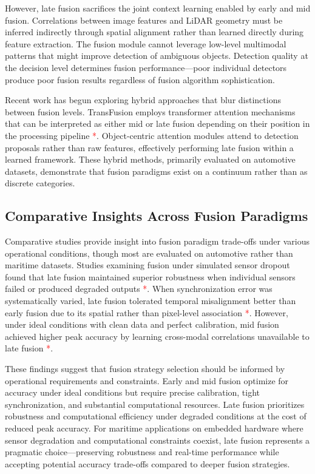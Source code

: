 \documentclass[../main.tex]{subfiles}
\begin{document}
However, late fusion sacrifices the joint context learning enabled by early and mid fusion. Correlations between image features and LiDAR geometry must be inferred indirectly through spatial alignment rather than learned directly during feature extraction. The fusion module cannot leverage low-level multimodal patterns that might improve detection of ambiguous objects. Detection quality at the decision level determines fusion performance—poor individual detectors produce poor fusion results regardless of fusion algorithm sophistication.

Recent work has begun exploring hybrid approaches that blur distinctions between fusion levels. TransFusion employs transformer attention mechanisms that can be interpreted as either mid or late fusion depending on their position in the processing pipeline \textcolor{red}{*}. Object-centric attention modules attend to detection proposals rather than raw features, effectively performing late fusion within a learned framework. These hybrid methods, primarily evaluated on automotive datasets, demonstrate that fusion paradigms exist on a continuum rather than as discrete categories.

\subsection{Comparative Insights Across Fusion Paradigms}

Comparative studies provide insight into fusion paradigm trade-offs under various operational conditions, though most are evaluated on automotive rather than maritime datasets. Studies examining fusion under simulated sensor dropout found that late fusion maintained superior robustness when individual sensors failed or produced degraded outputs \textcolor{red}{*}. When synchronization error was systematically varied, late fusion tolerated temporal misalignment better than early fusion due to its spatial rather than pixel-level association \textcolor{red}{*}. However, under ideal conditions with clean data and perfect calibration, mid fusion achieved higher peak accuracy by learning cross-modal correlations unavailable to late fusion \textcolor{red}{*}.

These findings suggest that fusion strategy selection should be informed by operational requirements and constraints. Early and mid fusion optimize for accuracy under ideal conditions but require precise calibration, tight synchronization, and substantial computational resources. Late fusion prioritizes robustness and computational efficiency under degraded conditions at the cost of reduced peak accuracy. For maritime applications on embedded hardware where sensor degradation and computational constraints coexist, late fusion represents a pragmatic choice—preserving robustness and real-time performance while accepting potential accuracy trade-offs compared to deeper fusion strategies.
\end{document}

